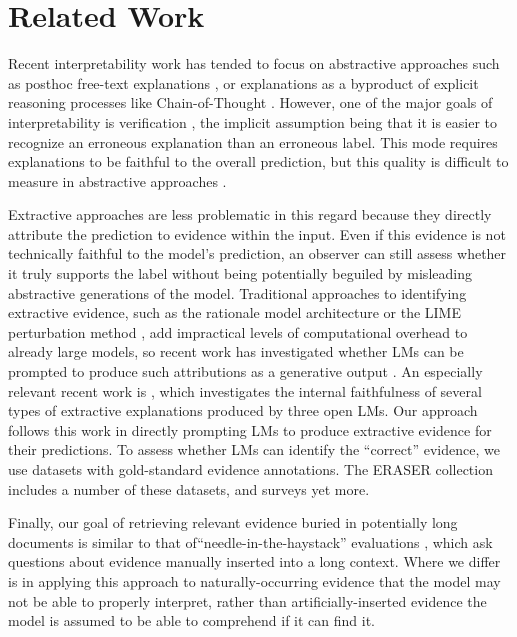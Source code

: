 \section{Related Work}


Recent interpretability work has tended to focus on abstractive approaches such as posthoc free-text explanations \cite{singh_rethinking_2024, zhu_explanation_2024}, or explanations as a byproduct of explicit reasoning processes like Chain-of-Thought \cite{wei_chain_2022, lanham_measuring_2023}. However, one of the major goals of interpretability is verification \cite{fok_search_2023}, the implicit assumption being that it is easier to recognize an erroneous explanation than an erroneous label. This mode requires explanations to be faithful \cite{jacovi_towards_2020} to the overall prediction, but this quality is difficult to measure in abstractive approaches \cite{agarwal_faithfulness_2024, siegel_probabilities_2024}.

Extractive approaches are less problematic in this regard because they directly attribute the prediction to evidence within the input. Even if this evidence is not technically faithful to the model's prediction, an observer can still assess whether it truly supports the label without being potentially beguiled by misleading abstractive generations of the model. Traditional approaches to identifying extractive evidence, such as the rationale model architecture \cite{lei_rationalizing_2016} or the LIME perturbation method \cite{ribeiro_why_2016}, add impractical levels of computational overhead to already large models, so recent work has investigated whether LMs can be prompted to produce such attributions as a generative output \cite{huang_can_2023,hu_think_2023, majumder_knowledge-grounded_2022}. An especially relevant recent work is \cite{madsen_are_2024}, which investigates the internal faithfulness of several types of extractive explanations produced by three open LMs. Our approach follows this work in directly prompting LMs to produce extractive evidence for their predictions. To assess whether LMs can identify the ``correct'' evidence, we use datasets with gold-standard evidence annotations. The ERASER collection \cite{deyoung_eraser_2019} includes a number of these datasets, and \cite{wiegreffe_teach_2021} surveys yet more. 

Finally, our goal of retrieving relevant evidence buried in potentially long documents is similar to that of``needle-in-the-haystack'' evaluations \cite{dhinakaran_needle_2024}, which ask questions about evidence manually inserted into a long context. Where we differ is in applying this approach to naturally-occurring evidence that the model may not be able to properly interpret, rather than artificially-inserted evidence the model is assumed to be able to comprehend if it can find it.